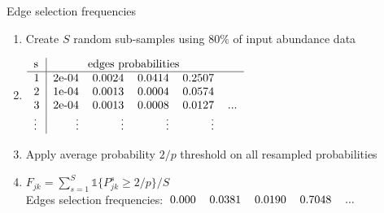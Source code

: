 \documentclass[11pt]{beamer}
\newcommand{\emphase}[1]{\textcolor{Complement}{#1}}
\begin{document}
\begin{frame}{Edge selection frequencies}\small
\begin{enumerate}
\item Create \emphase{$S$ random sub-samples} using $80\%$ of input abundance data
\item \footnotesize $ 
\begin{tabular}{l|rrrrc}
s & \multicolumn{4}{c}{edges probabilities}&\\\hline
1&2e-04& 0.0024& 0.0414 &0.2507&\\
2&1e-04 &0.0013 &0.0004 &0.0574&\\
3&2e-04 &0.0013 &0.0008 &0.0127&...\\
\vdots&\vdots & \vdots & \vdots & \vdots&  
\end{tabular}$
\item   \small
Apply average probability \emphase{$2/p$ threshold} on all resampled probabilities

\item   $\displaystyle F_{jk} = \sum_{s=1}^S \mathds{1}\{P_{jk}^s\geq 2/p\}/S$\\
Edges selection frequencies:$
\begin{tabular}{rrrrc}
0.000 &0.0381 &0.0190 &0.7048&...
 \end{tabular}$

\end{enumerate}

 

 \end{frame}
\end{document}
